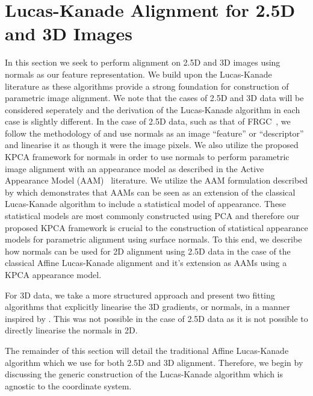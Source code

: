 \section{Lucas-Kanade Alignment for 2.5D and 3D Images}\label{sec:singl_imag_lk}
In this section we seek to perform alignment on 2.5D and 3D images using
normals as our feature representation. We build upon the 
Lucas-Kanade~\cite{lucas1981iterative} literature as these algorithms provide
a strong foundation for construction of parametric image alignment. We note that
the cases of 2.5D and 3D data will be considered seperately and the derivation
of the Lucas-Kanade algorithm in each case is slightly different. In the
case of 2.5D data, such as that of FRGC~\cite{phillips2005overview}, we follow
the methodology of \citet{antonakos2015feature} and use normals as an image
``feature'' or ``descriptor'' and linearise it as though it were the image pixels.
We also utilize the proposed KPCA framework for normals in order to use normals
to perform parametric image alignment with an appearance model as described
in the Active Appearance Model (AAM)~\cite{cootes2001active} literature. We
utilize the AAM formulation described by \citet{matthews2004active} which
demonstrates that AAMs can be seen as an extension of the classical Lucas-Kanade
algorithm to include a statistical model of appearance. These statistical models
are most commonly constructed using PCA and therefore our proposed KPCA
framework is crucial to the construction of statistical appearance models for
parametric alignment using surface normals. To this end, we describe how
normals can be used for 2D alignment using 2.5D data in the case of the
classical Affine Lucas-Kanade alignment and it's extension as AAMs using a 
KPCA appearance model.

For 3D data, we take a more structured approach and present two fitting algorithms
that explicitly linearise the 3D gradients, or normals, in a manner inspired
by \citet{tzimiropoulos2011robust}. This was not possible in the case of 2.5D
data as it is not possible to directly linearise the normals in 2D.

The remainder of this section will detail the traditional Affine Lucas-Kanade
algorithm which we use for both 2.5D and 3D alignment. Therefore, we begin by
discussing the generic construction of the Lucas-Kanade algorithm which is
agnostic to the coordinate system.
